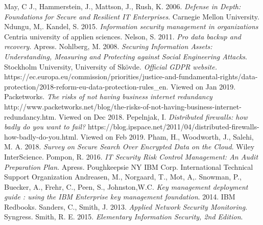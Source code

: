 \documentclass{article}
\begin{document}
\begin{thebibliography}{9}
	May, C J.,
	Hammerstein, J.,
	Mattson, J.,
	Rush, K.
	2006.
	\textit{Defense in Depth: Foundations for Secure and Resilient IT Enterprises}.
	Carnegie Mellon University.
	Ndungu, M,.
	Kandel, S.
	2015.
	\textit{Information security management in organizations}
	Centria university of applien sciences.
        Nelson, S.
        2011.
        \textit{Pro data backup and recovery}.
	Apress.
	Nohlberg, M.
	2008.
	\textit{Securing Information Assets: Understanding, Measuring and Protecting against Social Engineering Attacks}.
	Stockholm University,
	University of Skövde.
	\textit{Official GDPR website.}
	https://ec.europa.eu/commission/priorities/justice-and-fundamental-rights/data-protection/2018-reform-eu-data-protection-rules\_en.
	Viewed on Jan 2019.
	Packetworks.
	\textit{The risks of not having business internet redundancy}
	http://www.packetworks.net/blog/the-risks-of-not-having-business-internet-redundancy.htm.
	Viewed on Dec 2018.
	Pepelnjak, I.
	\textit{Distributed firewalls: how badly do you want to fail?}
	https://blog.ipspace.net/2011/04/distributed-firewalls-how-badly-do-you.html.
	Viewed on Feb 2019.
	Pham, H.,
	Woodworth, J.,
	Salehi, M. A.
	2018.
	\textit{Survey on Secure Search Over Encrypted Data on the Cloud}.
	Wiley InterScience.
        Pompon, R.
        2016.
        \textit{IT Security Risk Control Management: An Audit Preparation Plan}.
	Apress.
        Poughkeepsie NY IBM Corp. International Technical Support Organization
        Andreasen, M.,
        Norgaard, T.,
        Mot, A,.
        Snowman, P.,
        Buecker, A.,
        Frehr, C.,
        Peen, S.,
        Johnston,W.C.
	\textit{Key management deployment guide : using the IBM Enterprise key management foundation}.
        2014.
	IBM Redbooks.
        Sanders, C.,
	Smith, J.
        2013.
        \textit{Applied Network Security Monitoring}.
	Syngress.
        Smith, R. E.
        2015.
	\textit{Elementary Information Security, 2nd Edition}.

\end{thebibliography}
\end{document}
